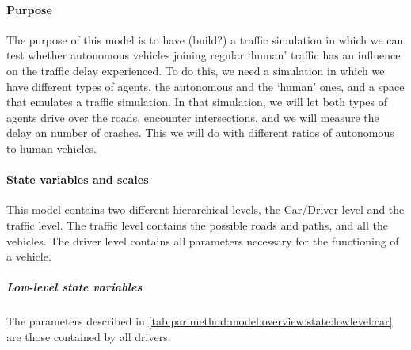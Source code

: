 \paragraph{Purpose}
\label{par:method:model:overview:purpose}

The purpose of this model is to have (build?) a traffic simulation in which we can test whether autonomous vehicles joining regular `human' traffic has an influence on the traffic delay experienced. To do this, we need a simulation in which we have different types of agents, the autonomous and the `human' ones, and a space that emulates a traffic simulation. In that simulation, we will let both types of agents drive over the roads, encounter intersections, and we will measure the delay an number of crashes. This we will do with different ratios of autonomous to human vehicles. 

\paragraph{State variables and scales}
\label{par:method:model:overview:state}

This model contains two different hierarchical levels, the Car/Driver level and the traffic level. The traffic level contains the possible roads and paths, and all the vehicles. The driver level contains all parameters necessary for the functioning of a vehicle.  

	\subparagraph{Low-level state variables}
	The parameters described in \cref{tab:par:method:model:overview:state:lowlevel:car} are those contained by all drivers. 


